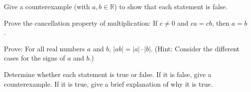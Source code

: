 \documentclass[12pt]{exam}
\begin{document}
\begin{questions}
\question[10]
Give a counterexample (with $a, b \in \mathbb{R}$) to show that each statement is false.

\question[12]
Prove the cancellation property of multiplication: If $c \neq 0$ and $ca = cb$, then $a=b$.
\vspace*{8cm}

\newpage

\question[10]
Prove: For all real numbers $a$ and $b$, $|ab| = |a| \cdot |b|$. (Hint: Consider the different cases for the signs of $a$ and $b$.)
\vspace*{7cm}

\newpage

\question[8]

\newpage

\question[16]
Determine whether each statement is true or false. If it is false, give a counterexample. If it is true, give a brief explanation of why it is true.
\end{questions}
\end{document}
